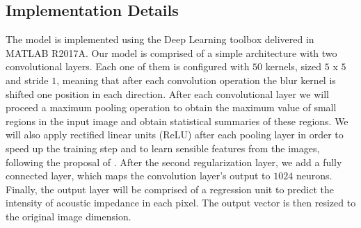 \documentclass[conference]{IEEEtran}
\begin{document}
\subsection{Implementation Details}
The model is implemented using the Deep Learning toolbox
delivered in MATLAB R2017A. Our model is comprised of a simple architecture with two convolutional layers.
Each one of them is configured with $50$ kernels, sized $5$ x $5$
and stride $1$, meaning that after each convolution operation the blur kernel is shifted
one position in each direction. After each convolutional layer we will proceed a maximum pooling operation
to obtain the maximum value of small regions in the input image and obtain statistical summaries of these regions. We will also
apply rectified linear units (ReLU) after each pooling layer in order to speed up the training
step and to learn sensible features from the images, following the proposal of \cite{Nair2010}. After
the second regularization layer,  we add a fully connected layer, which maps the convolution layer's output
to $1024$ neurons. Finally, the output layer will be comprised of a regression unit to predict the intensity of acoustic impedance in each pixel.
The output vector is then resized to the original image dimension.
\end{document}
